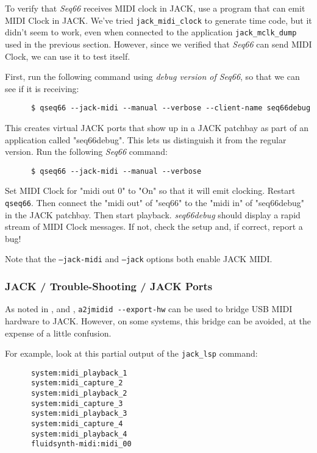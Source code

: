    To verify that \textsl{Seq66} receives MIDI clock in JACK, use a program
   that can emit MIDI Clock in JACK.
   We've tried \texttt{jack\_midi\_clock} to generate time code, but
   it didn't seem to work, even when connected to the
   application \texttt{jack\_mclk\_dump} used in the previous section.
   However, since we verified that \textsl{Seq66} can send MIDI Clock, we can
   use it to test itself.

   First, run the following command using \textsl{debug version of Seq66}, so
   that we can see if it is receiving:

   \begin{verbatim}
      $ qseq66 --jack-midi --manual --verbose --client-name seq66debug
   \end{verbatim}

   This creates virtual JACK ports that show up in a JACK patchbay as part of
   an application called "seq66debug".  This lets us distinguish it from
   the regular version.  Run the following \textsl{Seq66} command:

   \begin{verbatim}
      $ qseq66 --jack-midi --manual --verbose
   \end{verbatim}

   Set MIDI Clock for "midi out 0" to "On" so that it will emit clocking.
   Restart \texttt{qseq66}.
   Then connect the "midi out" of "seq66" to the "midi in" of "seq66debug"
   in the JACK patchbay.
   Then start playback.
   \textsl{seq66debug} should display a rapid stream of MIDI Clock messages.
   If not, check the setup and, if correct, report a bug!

   Note that the \texttt{--jack-midi} and \texttt{--jack} options both
   enable JACK MIDI.

\subsubsection{JACK / Trouble-Shooting / JACK Ports}
\label{subsubsec:jack_trouble_shooting_jack_ports}

   As noted in
   , and
   ,
   \texttt{a2jmidid -{}-export-hw} can be used to bridge USB MIDI
   hardware to JACK.  However, on some systems, this bridge can be
   avoided, at the expense of a little confusion.

   For example, look at this partial output of the \texttt{jack\_lsp}
   command:

   \begin{verbatim}
      system:midi_playback_1
      system:midi_capture_2
      system:midi_playback_2
      system:midi_capture_3
      system:midi_playback_3
      system:midi_capture_4
      system:midi_playback_4
      fluidsynth-midi:midi_00
   \end{verbatim}

